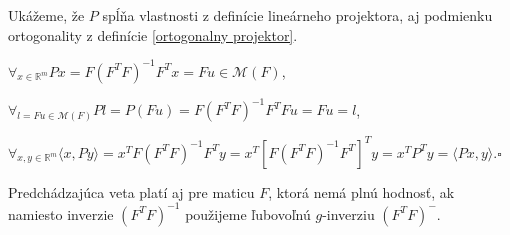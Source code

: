 \begin{dokaz}
Ukážeme, že $P$ spĺňa vlastnosti z definície lineárneho projektora, aj podmienku ortogonality z definície \ref{ortogonalny projektor}.
\begin{center}
$
{\forall}_{x \in \mathbb{R}^m} Px = F(F^T F)^{-1} F^T x = Fu \in \mathcal{M}(F)
$,
\end{center}
\begin{center}
$
{\forall}_{l = Fu \in \mathcal{M}(F)} Pl = P(Fu) = F(F^T F)^{-1} F^T F u = Fu = l
$,
\end{center}
\begin{center}
$
{\forall}_{x, y \in \mathbb{R}^m} \langle x, Py \rangle = x^T F(F^T F)^{-1} F^T y = x^T [F (F^T F)^{-1} F^T]^T y = x^T P^T y = \langle Px, y \rangle
$.$\square$
\end{center}
\end{dokaz}

\begin{theorem}
\label{ortogonalny projektor na maticu}
Predchádzajúca veta platí aj pre maticu $F$, ktorá nemá plnú hodnosť,
ak namiesto inverzie $(F^T F)^{-1}$ použijeme ľubovoľnú $g$-inverziu $(F^T F)^{-}$.
\end{theorem}